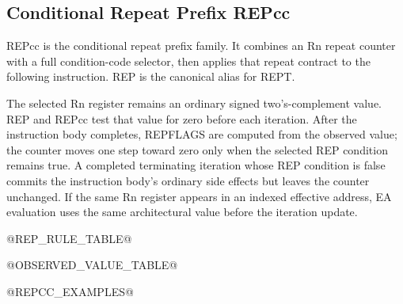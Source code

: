 \subsection{Conditional Repeat Prefix REPcc}
REPcc is the conditional repeat prefix family. It combines an Rn repeat counter with a full condition-code
selector, then applies that repeat contract to the following instruction. REP is the canonical alias for REPT.

The selected Rn register remains an ordinary signed two's-complement value. REP and REPcc test that value for
zero before each iteration. After the instruction body completes, REPFLAGS are computed from the observed value;
the counter moves one step toward zero only when the selected REP condition remains true. A completed terminating
iteration whose REP condition is false commits the instruction body's ordinary side effects but leaves the counter
unchanged. If the same Rn register appears in an indexed effective address, EA evaluation uses the same
architectural value before the iteration update.

@REP_RULE_TABLE@

@OBSERVED_VALUE_TABLE@

@REPCC_EXAMPLES@
